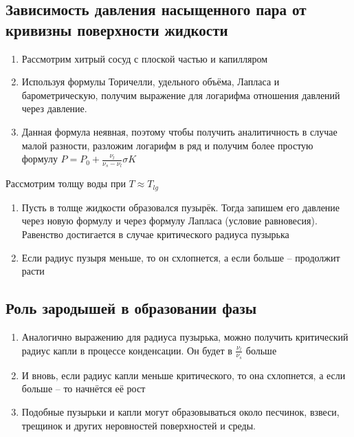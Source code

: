 \documentclass[a4paper, 14pt]{article}
\begin{document}
    \subsection{Зависимость давления насыщенного пара от кривизны поверхности жидкости}

    \begin{enumerate}
        \item Рассмотрим хитрый сосуд с плоской частью и капилляром
        \item Используя формулы Торичелли, удельного объёма, Лапласа и барометрическую, получим выражение для
        логарифма отношения давлений через давление.
        \item Данная формула неявная, поэтому чтобы получить аналитичность в случае малой разности, разложим логарифм
        в ряд и получим более простую формулу $P = P_0 + \frac{\nu_l}{\nu_s - \nu_l}\sigma K$
    \end{enumerate}

    Рассмотрим толщу воды при $T \approx T_{lg}$

    \begin{enumerate}
        \item Пусть в толще жидкости образовался пузырёк.
        Тогда запишем его давление через новую формулу и через формулу Лапласа (условие равновесия).
        Равенство достигается в случае критического радиуса пузырька
        \item Если радиус пузыря меньше, то он схлопнется, а если больше -- продолжит расти
    \end{enumerate}

    \subsection{Роль зародышей в образовании фазы}

    \begin{enumerate}
        \item Аналогично выражению для радиуса пузырька, можно получить критический радиус капли в процессе
        конденсации.
        Он будет в $\frac{\nu_l}{\nu_s}$ больше
        \item И вновь, если радиус капли меньше критического, то она схлопнется, а если больше -- то начнётся её рост
        \item Подобные пузырьки и капли могут образовываться около песчинок, взвеси, трещинок и других неровностей
        поверхностей и среды.
    \end{enumerate}
\end{document}
